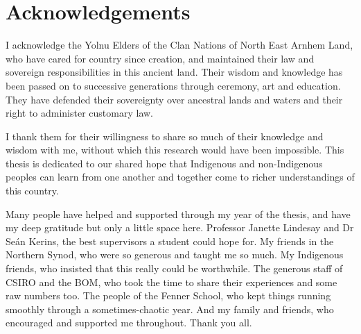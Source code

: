 \chapter{Acknowledgements}

I acknowledge the Yolnu Elders of the Clan Nations of North East Arnhem
Land, who have cared for country since creation, and maintained their
law and sovereign responsibilities in this ancient land.
Their wisdom and knowledge has been passed on to successive generations
through ceremony, art and education.  They have defended their sovereignty
over ancestral lands and waters and their right to administer customary law.

I thank them for their willingness to share so much of their knowledge
and wisdom with me, without which this research would have been impossible.
This thesis is dedicated to our shared hope that Indigenous and non-Indigenous
peoples can learn from one another and together come to richer understandings
of this country.

\vspace{1.5in}

Many people have helped and supported through my year of the thesis,
and have my deep gratitude but only a little space here.  Professor Janette
Lindesay and Dr Seán Kerins, the best supervisors a student could hope for.
My friends in the Northern Synod, who were so generous and taught me so much.
My Indigenous friends, who insisted that this really could be worthwhile.
The generous staff of CSIRO and the BOM, who took the time to share their
experiences and some raw numbers too.  The people of the Fenner School, who
kept things running smoothly through a sometimes-chaotic year.  And
my family and friends, who encouraged and supported me throughout.
Thank you all.
